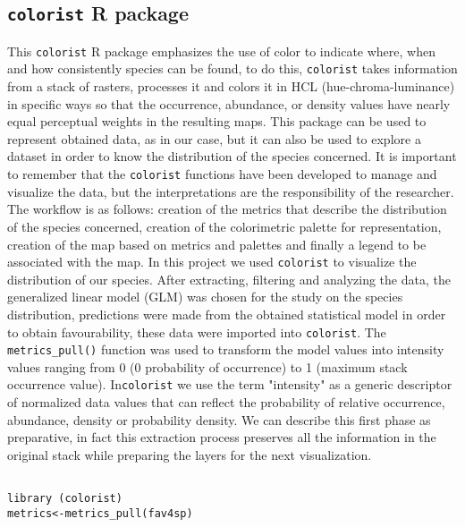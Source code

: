 \documentclass[12pt,a4paper]{article}
\begin{document}
\subsection{\texttt{colorist} R package}
This \texttt{colorist} R package emphasizes the use of color to indicate where, when and how consistently species can be found, to do this, \texttt{colorist} takes information from a stack of rasters, processes it and colors it in HCL (hue-chroma-luminance) in specific ways so that the occurrence, abundance, or density values have nearly equal perceptual weights in the resulting maps. \citep{colo}
This package can be used to represent obtained data, as in our case, but it can also be used to explore a dataset in order to know the distribution of the species concerned.
It is important to remember that the \texttt{colorist} functions have been developed to manage and visualize the data, but the interpretations are the responsibility of the researcher.\citep{colo}
The workflow is as follows: creation of the metrics that describe the distribution of the species concerned, creation of the colorimetric palette for representation, creation of the map based on metrics and palettes and finally a legend to be associated with the map.
In this project we used \texttt{colorist} to visualize the distribution of our species.
After extracting, filtering and analyzing the data, the generalized linear model (GLM) was chosen for the study on the species distribution, predictions were made from the obtained statistical model in order to obtain favourability, these data were imported into \texttt{colorist}.
The \texttt{metrics\_pull()} function was used to transform the model values into intensity values ranging from 0 (0 probability of occurrence) to 1 (maximum stack occurrence value).
  In\texttt{colorist} we use the term "intensity" as a generic descriptor of normalized data values that can reflect the probability of relative occurrence, abundance, density or probability density.\citep{colo}
We can describe this first phase as preparative, in fact this extraction process preserves all the information in the original stack while preparing the layers for the next visualization.

\begin{lstlisting}

library (colorist)
metrics<-metrics_pull(fav4sp) 

\end{lstlisting}
\end{document}
